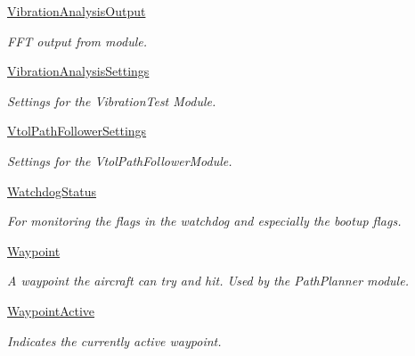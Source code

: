\begin{DoxyCompactItemize}
\hyperlink{group___vibration_analysis_output}{\-Vibration\-Analysis\-Output}
\begin{DoxyCompactList}\small\item\em \-F\-F\-T output from  module. \end{DoxyCompactList}\item 
\hyperlink{group___vibration_analysis_settings}{\-Vibration\-Analysis\-Settings}
\begin{DoxyCompactList}\small\item\em \-Settings for the \-Vibration\-Test \-Module. \end{DoxyCompactList}\item 
\hyperlink{group___vtol_path_follower_settings}{\-Vtol\-Path\-Follower\-Settings}
\begin{DoxyCompactList}\small\item\em \-Settings for the \-Vtol\-Path\-Follower\-Module. \end{DoxyCompactList}\item 
\hyperlink{group___watchdog_status}{\-Watchdog\-Status}
\begin{DoxyCompactList}\small\item\em \-For monitoring the flags in the watchdog and especially the bootup flags. \end{DoxyCompactList}\item 
\hyperlink{group___waypoint}{\-Waypoint}
\begin{DoxyCompactList}\small\item\em \-A waypoint the aircraft can try and hit. \-Used by the \-Path\-Planner module. \end{DoxyCompactList}\item 
\hyperlink{group___waypoint_active}{\-Waypoint\-Active}
\begin{DoxyCompactList}\small\item\em \-Indicates the currently active waypoint. \end{DoxyCompactList}\end{DoxyCompactItemize}
